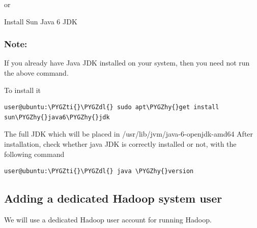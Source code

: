 \documentclass[a4paper,12pt,oneside]{sphinxmanual}
\def\PYGZdl{\char`\$}
\def\PYGZhy{\char`\-}
\def\PYGZti{\char`\~}
\begin{document}
or

Install Sun Java 6 JDK
\begin{figure}[htbp]
\centering

\end{figure}


\subsubsection{Note:}
\label{document:note}
If you already have Java JDK installed on your system, then you need not run the above command.

To install it

\begin{Verbatim}[commandchars=\\\{\}]
user@ubuntu:\PYGZti{}\PYGZdl{} sudo apt\PYGZhy{}get install sun\PYGZhy{}java6\PYGZhy{}jdk
\end{Verbatim}

The full JDK which will be placed in /usr/lib/jvm/java-6-openjdk-amd64
After installation, check whether java JDK is correctly installed or not, with the following command

\begin{Verbatim}[commandchars=\\\{\}]
user@ubuntu:\PYGZti{}\PYGZdl{} java \PYGZhy{}version
\end{Verbatim}


\subsection{Adding a dedicated Hadoop system user}
\label{document:adding-a-dedicated-hadoop-system-user}
We will use a dedicated Hadoop user account for running Hadoop.
\end{document}
